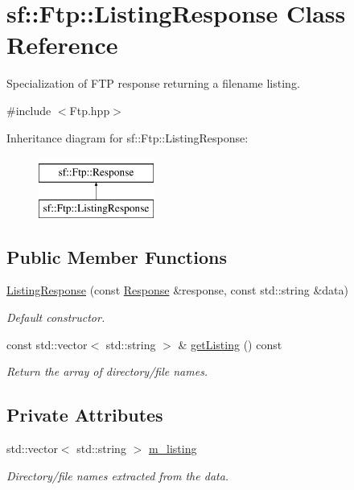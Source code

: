 \hypertarget{classsf_1_1_ftp_1_1_listing_response}{}\section{sf\+:\+:Ftp\+:\+:Listing\+Response Class Reference}
\label{classsf_1_1_ftp_1_1_listing_response}


Specialization of F\+TP response returning a filename listing.  




{\ttfamily \#include $<$Ftp.\+hpp$>$}

Inheritance diagram for sf\+:\+:Ftp\+:\+:Listing\+Response\+:\begin{figure}[H]
\begin{center}
\leavevmode
\includegraphics[height=2.000000cm]{classsf_1_1_ftp_1_1_listing_response}
\end{center}
\end{figure}
\subsection*{Public Member Functions}
\begin{DoxyCompactItemize}
\item 
\mbox{\hyperlink{classsf_1_1_ftp_1_1_listing_response_a7e98d0aed70105c71adb52e5b6ce0bb8}{Listing\+Response}} (const \mbox{\hyperlink{classsf_1_1_ftp_1_1_response}{Response}} \&response, const std\+::string \&data)
\begin{DoxyCompactList}\small\item\em Default constructor. \end{DoxyCompactList}\item 
const std\+::vector$<$ std\+::string $>$ \& \mbox{\hyperlink{classsf_1_1_ftp_1_1_listing_response_a6cdcdfcc6a9008c7e1eddb48b164793d}{get\+Listing}} () const
\begin{DoxyCompactList}\small\item\em Return the array of directory/file names. \end{DoxyCompactList}\end{DoxyCompactItemize}
\subsection*{Private Attributes}
\begin{DoxyCompactItemize}
\item 
\mbox{\label{classsf_1_1_ftp_1_1_listing_response_a65ca6597417d650fe73efc856ca551d6}} 
std\+::vector$<$ std\+::string $>$ \mbox{\hyperlink{classsf_1_1_ftp_1_1_listing_response_a65ca6597417d650fe73efc856ca551d6}{m\+\_\+listing}}
\begin{DoxyCompactList}\small\item\em Directory/file names extracted from the data. \end{DoxyCompactList}\end{DoxyCompactItemize}
